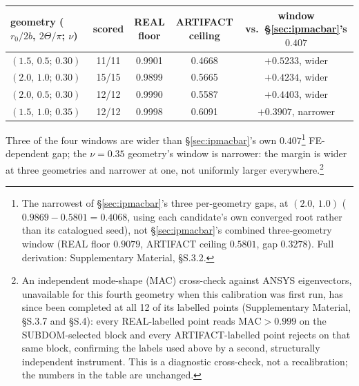 \documentclass[11pt]{article}
\begin{document}
\begin{center}\footnotesize
\begin{tabular}{lcccc}
\hline
geometry ($r_0/2b$, $2\Theta/\pi$; $\nu$) & scored & REAL floor & ARTIFACT ceiling & window vs.\ \S\ref{sec:ipmacbar}'s $0.407$ \\
\hline
$(1.5,\,0.5;\,0.30)$ & 11/11 & 0.9901 & 0.4668 & $+0.5233$, wider \\
$(2.0,\,1.0;\,0.30)$ & 15/15 & 0.9899 & 0.5665 & $+0.4234$, wider \\
$(2.0,\,0.5;\,0.30)$ & 12/12 & 0.9990 & 0.5587 & $+0.4403$, wider \\
$(1.5,\,1.0;\,0.35)$ & 12/12 & 0.9998 & 0.6091 & $+0.3907$, narrower \\
\hline
\end{tabular}
\end{center}

\noindent Three of the four windows are wider than \S\ref{sec:ipmacbar}'s
own $0.407$\footnote{The narrowest of \S\ref{sec:ipmacbar}'s three per-geometry gaps, at $(2.0,\,1.0)$ ($0.9869-0.5801=0.4068$, using each candidate's own converged root rather than its catalogued seed), not \S\ref{sec:ipmacbar}'s combined three-geometry window (REAL floor $0.9079$, ARTIFACT ceiling $0.5801$, gap $0.3278$). Full derivation: Supplementary Material, \S S.3.2.} FE-dependent gap; the $\nu=0.35$ geometry's window is
narrower: the margin is wider at three geometries and narrower at one, not uniformly larger everywhere.\footnote{An independent mode-shape (MAC) cross-check
against ANSYS eigenvectors, unavailable for this fourth geometry when
this calibration was first run, has since been completed at all 12 of
its labelled points (Supplementary Material, §S.3.7 and §S.4):
every REAL-labelled point reads $\mathrm{MAC}>0.999$ on the
SUBDOM-selected block and every ARTIFACT-labelled point rejects on
that same block, confirming the labels used above by a second,
structurally independent instrument. This is a diagnostic
cross-check, not a recalibration; the numbers in the table are
unchanged.}
\end{document}
